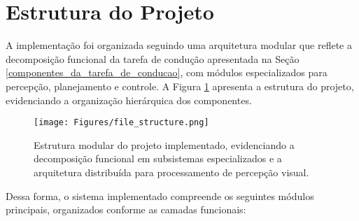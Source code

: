 \section{Estrutura do Projeto} \label{sec:estrutura_projeto}

A implementação foi organizada seguindo uma arquitetura modular que reflete a decomposição funcional da tarefa de condução apresentada na Seção \ref{componentes_da_tarefa_de_conducao}, com módulos especializados para percepção, planejamento e controle. A Figura \ref{project_structure} apresenta a estrutura do projeto, evidenciando a organização hierárquica dos componentes.

\begin{figure}[H]
\centering
\texttt{[image: Figures/file\_structure.png]}
\caption{Estrutura modular do projeto implementado, evidenciando a decomposição funcional em subsistemas especializados e a arquitetura distribuída para processamento de percepção visual.}
\label{project_structure}
\end{figure}

Dessa forma, o sistema implementado compreende os seguintes módulos principais, organizados conforme as camadas funcionais:

